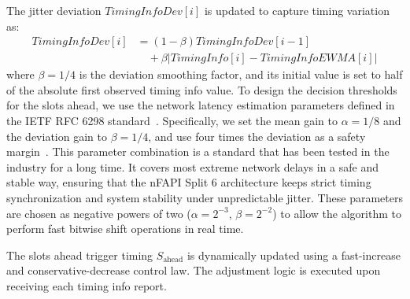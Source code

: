 \documentclass[../my_ntust_thesis.tex]{subfiles}
\begin{document}
The jitter deviation $\mathit{TimingInfoDev}[i]$ is updated to capture timing variation as:
\begin{equation}
\begin{split}
\mathit{TimingInfoDev}[i] & = (1 - \beta) \mathit{TimingInfoDev}[i-1] \\
& \quad + \beta |\mathit{TimingInfo}[i] - \mathit{TimingInfoEWMA}[i]|
\end{split}
\end{equation}
where $\beta = 1/4$ is the deviation smoothing factor, and its initial value is set to half of the absolute first observed timing info value. To design the decision thresholds for the slots ahead, we use the network latency estimation parameters defined in the IETF RFC 6298 standard~\cite{rfc6298}. Specifically, we set the mean gain to $\alpha = 1/8$ and the deviation gain to $\beta = 1/4$, and use four times the deviation as a safety margin~\cite{rfc6298}. This parameter combination is a standard that has been tested in the industry for a long time. It covers most extreme network delays in a safe and stable way, ensuring that the nFAPI Split 6 architecture keeps strict timing synchronization and system stability under unpredictable jitter. These parameters are chosen as negative powers of two ($\alpha = 2^{-3}$, $\beta = 2^{-2}$) to allow the algorithm to perform fast bitwise shift operations in real time.

The slots ahead trigger timing $S_{\mathrm{ahead}}$ is dynamically updated using a fast-increase and conservative-decrease control law. The adjustment logic is executed upon receiving each timing info report.
\end{document}
